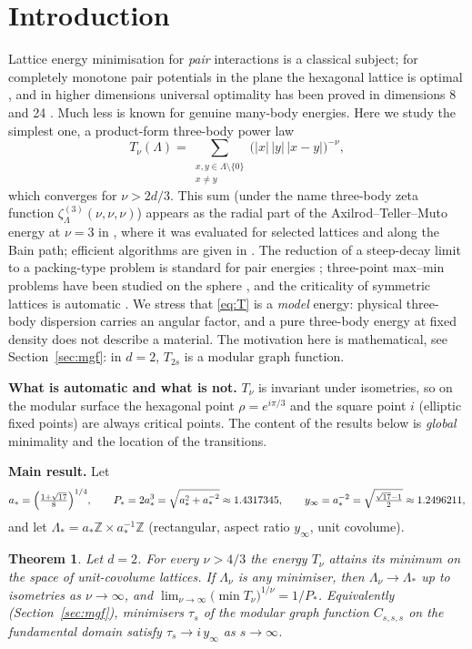 \documentclass[11pt,a4paper]{amsart}
\newtheorem{theorem}{Theorem}
\theoremstyle{definition}
\newcommand{\Z}{\mathbb{Z}}
\newcommand{\Lat}{\Lambda}
\begin{document}
\section{Introduction}
Lattice energy minimisation for \emph{pair} interactions is a classical subject; for completely monotone pair potentials in the plane the hexagonal lattice is optimal \cite{Rankin,Cassels,Ennola,Diananda,Montgomery}, and in higher dimensions universal optimality has been proved in dimensions 8 and 24 \cite{CKMRV}.
Much less is known for genuine many-body energies. Here we study the simplest one, a product-form three-body power law
\begin{equation}\label{eq:T}
T_\nu(\Lat)=\sum_{\substack{x,y\in\Lat\setminus\{0\}\\ x\neq y}}\bigl(|x|\,|y|\,|x-y|\bigr)^{-\nu},
\end{equation}
which converges for $\nu>2d/3$. This sum (under the name three-body zeta function $\zeta^{(3)}_\Lat(\nu,\nu,\nu)$) appears as the radial part of the Axilrod--Teller--Muto energy at $\nu=3$ in \cite{RoblesNavarro}, where it was evaluated for selected lattices and along the Bain path; efficient algorithms are given in \cite{BuchheitBusse,BuchheitRupp}. The reduction of a steep-decay limit to a packing-type problem is standard for pair energies \cite{BST}; three-point max--min problems have been studied on the sphere \cite{Bilyk}, and the criticality of symmetric lattices is automatic \cite{BetCrit}.
We stress that \eqref{eq:T} is a \emph{model} energy: physical three-body dispersion carries an angular factor, and a pure three-body energy at fixed density does not describe a material. The motivation here is mathematical, see Section~\ref{sec:mgf}: in $d=2$, $T_{2s}$ is a modular graph function.

\smallskip\noindent\textbf{What is automatic and what is not.} $T_\nu$ is invariant under isometries, so on the modular surface the hexagonal point $\rho=e^{i\pi/3}$ and the square point $i$ (elliptic fixed points) are always critical points. The content of the results below is \emph{global} minimality and the location of the transitions.

\smallskip\noindent\textbf{Main result.} Let
\[
a_*=\Bigl(\tfrac{1+\sqrt{17}}{8}\Bigr)^{1/4},\qquad P_*=2a_*^3=\sqrt{a_*^2+a_*^{-2}}\approx 1.4317345,\qquad y_\infty=a_*^{-2}=\sqrt{\tfrac{\sqrt{17}-1}{2}}\approx1.2496211,
\]
and let $\Lat_*=a_*\Z\times a_*^{-1}\Z$ (rectangular, aspect ratio $y_\infty$, unit covolume).

\begin{theorem}\label{thm:main}
Let $d=2$. For every $\nu>4/3$ the energy $T_\nu$ attains its minimum on the space of unit-covolume lattices. If $\Lat_\nu$ is any minimiser, then $\Lat_\nu\to\Lat_*$ up to isometries as $\nu\to\infty$, and
$\lim_{\nu\to\infty}\bigl(\min T_\nu\bigr)^{1/\nu}=1/P_*$.
Equivalently (Section~\ref{sec:mgf}), minimisers $\tau_s$ of the modular graph function $C_{s,s,s}$ on the fundamental domain satisfy $\tau_s\to i\,y_\infty$ as $s\to\infty$.
\end{theorem}
\end{document}
